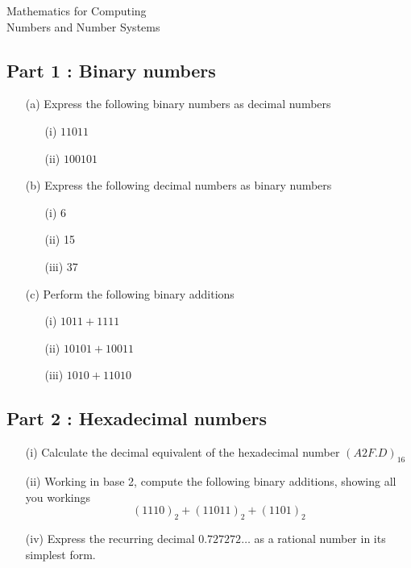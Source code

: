 \documentclass[12pt]{article}
\begin{document}
\begin{center}
\huge{Mathematics for Computing}\\
\LARGE{Numbers and Number Systems}
\end{center}

\subsection*{Part 1 : Binary numbers}
\begin{itemize}
\item[(a)] Express the following binary numbers as decimal numbers
\begin{itemize}
\item[(i)] $11011$
\item[(ii)] $100101$
\end{itemize}
\item[(b)] Express the following decimal numbers as binary numbers
\begin{itemize}
\item[(i)] 6
\item[(ii)] 15
\item[(iii)] 37
\end{itemize}
\item[(c)] Perform the following binary additions
\begin{itemize}
\item[(i)] $1011+ 1111$
\item[(ii)] $10101  + 10011$
\item[(iii)] $1010 + 11010$
\end{itemize}

\end{itemize}

\subsection*{Part 2 : Hexadecimal numbers}
\begin{itemize}
\item[(i)] Calculate the decimal equivalent of the hexadecimal number $(A2F.D)_{16}$
\item[(ii)] Working in base 2, compute the following binary additions, showing all you workings
\[(1110)_2 + (11011)_2 + (1101)_2 \]
\item[(iv)] Express the recurring decimal $0.727272\ldots$ as a rational number in its simplest form.
\end{itemize}
\end{document}
